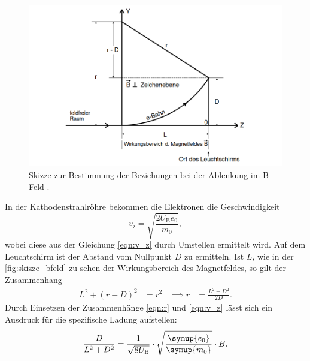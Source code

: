     \begin{figure} 
        \centering
        \includegraphics[width=\textwidth]{bilder/zeichnung_magnetfeld.png}
        \caption{Skizze zur Bestimmung der Beziehungen bei der Ablenkung im B-Feld \cite{anleitung502}.}
        \label{fig:skizze_bfeld}
    \end{figure}

    \noindent In der Kathodenstrahlröhre bekommen die Elektronen die Geschwindigkeit 
    \begin{equation*}
        v_{\text{z}} = \sqrt{\frac{2 U_{\text{B}}e_0}{m_0}},
    \end{equation*}
    wobei diese aus der Gleichung \eqref{eqn:v_z} durch Umstellen ermittelt wird. Auf dem Leuchtschirm ist der Abstand vom Nullpunkt $D$ zu ermitteln.
    Ist $L$, wie in der \autoref{fig:skizze_bfeld} zu sehen der Wirkungsbereich des Magnetfeldes, so gilt der Zusammenhang
    \begin{align*}
        L^2 + (r - D)^2 &= r^2  &\implies r &= \frac{L^2 + D^2}{2D}.
    \end{align*}
    Durch Einsetzen der Zusammenhänge \eqref{eqn:r} und \eqref{eqn:v_z} lässt sich ein Ausdruck für die spezifische Ladung aufstellen:
    \begin{equation}\label{eq:e0_m0}
        \frac{D}{L^2 + D^2} = \frac{1}{\sqrt{8 U_{\text{B}}}} \cdot \sqrt{\frac{\symup{e_0}}{\symup{m_0}}} \cdot B.
    \end{equation}